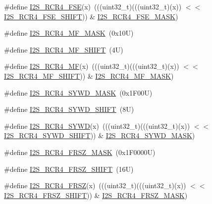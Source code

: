 \begin{DoxyCompactItemize}
\#define \mbox{\hyperlink{group___i2_s___register___masks_gaf8b25faa1ab7fa308da12ba8729f0415}{I2\+S\+\_\+\+R\+C\+R4\+\_\+\+F\+SE}}(x)~(((uint32\+\_\+t)(((uint32\+\_\+t)(x)) $<$$<$ \mbox{\hyperlink{group___i2_s___register___masks_ga37d794e272f05da947af5073c3340a6e}{I2\+S\+\_\+\+R\+C\+R4\+\_\+\+F\+S\+E\+\_\+\+S\+H\+I\+FT}})) \& \mbox{\hyperlink{group___i2_s___register___masks_ga9c6885d55f2de2dcd4649b15582dbd63}{I2\+S\+\_\+\+R\+C\+R4\+\_\+\+F\+S\+E\+\_\+\+M\+A\+SK}})
\item 
\#define \mbox{\hyperlink{group___i2_s___register___masks_ga7256d017dda987fcd8ac9daae80208b7}{I2\+S\+\_\+\+R\+C\+R4\+\_\+\+M\+F\+\_\+\+M\+A\+SK}}~(0x10\+U)
\item 
\#define \mbox{\hyperlink{group___i2_s___register___masks_gace2764bf30039c2f06ef202b86052ba4}{I2\+S\+\_\+\+R\+C\+R4\+\_\+\+M\+F\+\_\+\+S\+H\+I\+FT}}~(4\+U)
\item 
\#define \mbox{\hyperlink{group___i2_s___register___masks_ga3ddcb2181392f5f4d0b72bebac1e792d}{I2\+S\+\_\+\+R\+C\+R4\+\_\+\+MF}}(x)~(((uint32\+\_\+t)(((uint32\+\_\+t)(x)) $<$$<$ \mbox{\hyperlink{group___i2_s___register___masks_gace2764bf30039c2f06ef202b86052ba4}{I2\+S\+\_\+\+R\+C\+R4\+\_\+\+M\+F\+\_\+\+S\+H\+I\+FT}})) \& \mbox{\hyperlink{group___i2_s___register___masks_ga7256d017dda987fcd8ac9daae80208b7}{I2\+S\+\_\+\+R\+C\+R4\+\_\+\+M\+F\+\_\+\+M\+A\+SK}})
\item 
\#define \mbox{\hyperlink{group___i2_s___register___masks_ga1fb484ccadebeaab844b5dcfa0c89950}{I2\+S\+\_\+\+R\+C\+R4\+\_\+\+S\+Y\+W\+D\+\_\+\+M\+A\+SK}}~(0x1\+F00\+U)
\item 
\#define \mbox{\hyperlink{group___i2_s___register___masks_ga5ad9893dd40464452393719f845ae58d}{I2\+S\+\_\+\+R\+C\+R4\+\_\+\+S\+Y\+W\+D\+\_\+\+S\+H\+I\+FT}}~(8\+U)
\item 
\#define \mbox{\hyperlink{group___i2_s___register___masks_ga500886836a634bbb05fe4c03b091c2b9}{I2\+S\+\_\+\+R\+C\+R4\+\_\+\+S\+Y\+WD}}(x)~(((uint32\+\_\+t)(((uint32\+\_\+t)(x)) $<$$<$ \mbox{\hyperlink{group___i2_s___register___masks_ga5ad9893dd40464452393719f845ae58d}{I2\+S\+\_\+\+R\+C\+R4\+\_\+\+S\+Y\+W\+D\+\_\+\+S\+H\+I\+FT}})) \& \mbox{\hyperlink{group___i2_s___register___masks_ga1fb484ccadebeaab844b5dcfa0c89950}{I2\+S\+\_\+\+R\+C\+R4\+\_\+\+S\+Y\+W\+D\+\_\+\+M\+A\+SK}})
\item 
\#define \mbox{\hyperlink{group___i2_s___register___masks_ga8eda652c5a5ee719963f7103561bdc73}{I2\+S\+\_\+\+R\+C\+R4\+\_\+\+F\+R\+S\+Z\+\_\+\+M\+A\+SK}}~(0x1\+F0000\+U)
\item 
\#define \mbox{\hyperlink{group___i2_s___register___masks_gaae89e490a3b7562ea1a9a2992a6a97a7}{I2\+S\+\_\+\+R\+C\+R4\+\_\+\+F\+R\+S\+Z\+\_\+\+S\+H\+I\+FT}}~(16\+U)
\item 
\#define \mbox{\hyperlink{group___i2_s___register___masks_ga9fe4075aea194d85306a3f92420895f3}{I2\+S\+\_\+\+R\+C\+R4\+\_\+\+F\+R\+SZ}}(x)~(((uint32\+\_\+t)(((uint32\+\_\+t)(x)) $<$$<$ \mbox{\hyperlink{group___i2_s___register___masks_gaae89e490a3b7562ea1a9a2992a6a97a7}{I2\+S\+\_\+\+R\+C\+R4\+\_\+\+F\+R\+S\+Z\+\_\+\+S\+H\+I\+FT}})) \& \mbox{\hyperlink{group___i2_s___register___masks_ga8eda652c5a5ee719963f7103561bdc73}{I2\+S\+\_\+\+R\+C\+R4\+\_\+\+F\+R\+S\+Z\+\_\+\+M\+A\+SK}})
\end{DoxyCompactItemize}
